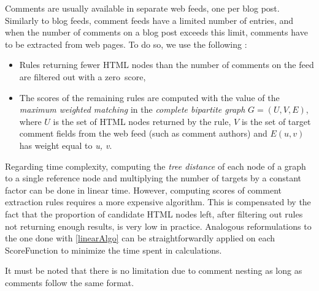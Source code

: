Comments are usually available in separate web feeds, one per blog post. 
Similarly to blog feeds, comment feeds have a limited number of entries, 
and when the number of comments on a blog post exceeds this limit, 
comments have to be extracted from web pages. To do so, we use the 
following :

\begin{itemize}
\item 
Rules returning fewer HTML nodes than the number of comments on the feed 
are filtered out with a zero~score,
\item 
The scores of the remaining rules are computed with the value of the 
\emph{maximum weighted matching} in the \emph{complete bipartite graph} 
$G = (U, V, E)$, where $U$ is the set of HTML nodes returned by the rule, 
$V$ is the set of target comment fields from the web feed (such as 
comment authors) and $E(u, v)$ has weight equal to 
\code{(}\emph{u, v}\code{)}.
\end{itemize}

Regarding time complexity, computing the \emph{tree distance} of each node of a graph to a single reference node and multiplying the number of targets by a constant factor can be done in linear time. However, computing scores of comment extraction rules requires a more expensive algorithm. This is compensated by the fact that the proportion of candidate HTML nodes left, after filtering out rules not returning enough results, is very low in practice. Analogous reformulations to the one done with \autoref{linearAlgo} can be straightforwardly applied on each ScoreFunction to minimize the time spent in  calculations.

It must be noted that there is no limitation due to comment nesting as long as comments follow the same format.
